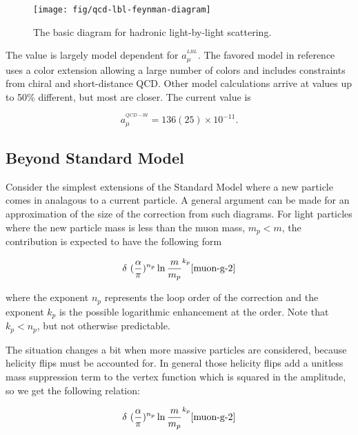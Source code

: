 \begin{figure}
\label{fig:qcd-lbl-feynman-diagram}
\texttt{[image: fig/qcd-lbl-feynman-diagram]}
\caption{The basic diagram for hadronic light-by-light scattering.}
\end{figure}

The value is largely model dependent for $a_\mu^{^{LBL}}$.  The favored model in reference \cite{amm-muon} uses a color extension allowing a large number of colors and includes constraints from chiral and short-distance QCD.  Other model calculations arrive at values up to 50\% different, but most are closer.  The current value is

\begin{equation}
\label{eqn:qcd-lbl-total}
a_\mu^{^{QCD-lbl}} = 136(25) \times 10^{-11}.
\end{equation}

\subsection{Beyond Standard Model}

Consider the simplest extensions of the Standard Model where a new particle comes in analagous to a current particle.  A general argument can be made for an approximation of the size of the correction from such diagrams.  For light particles where the new particle mass is less than the muon mass, $m_p < m$, the contribution is expected to have the following form

\begin{equation}
\label{eqn:bsm-general-small-m}
\delta ~ (\frac{\alpha}{\pi})^{n_p} \ln{\frac{m}{m_p}}^{k_p} \ref{muon-g-2}
\end{equation}

where the exponent $n_p$ represents the loop order of the correction  and the exponent $k_p$ is the possible logarithmic enhancement at the order.  Note that $k_p < n_p$, but not otherwise predictable.

The situation changes a bit when more massive particles are considered, because helicity flips must be accounted for.  In general those helicity flips add a unitless mass suppression term to the vertex function which is squared in the amplitude, so we get the following relation:

\begin{equation}
\label{eqn:bsm-general-large-m}
\delta ~ (\frac{\alpha}{\pi})^{n_p} \ln{\frac{m}{m_p}}^{k_p} \ref{muon-g-2}
\end{equation}

